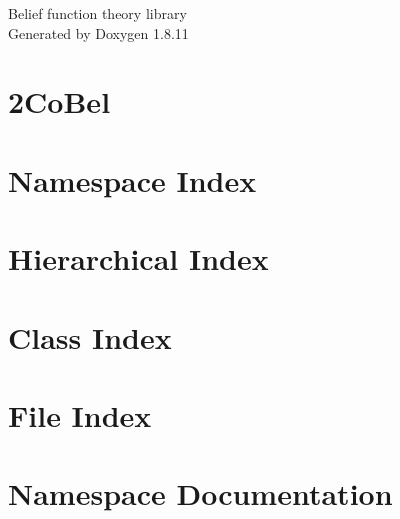 \documentclass[twoside]{book}
\newcommand{\+}{\discretionary{\mbox{\scriptsize$\hookleftarrow$}}{}{}}
\newcommand{\clearemptydoublepage}{%
  \newpage{\pagestyle{empty}\cleardoublepage}%
}
\begin{document}
\hypersetup{pageanchor=false,
             bookmarksnumbered=true,
             pdfencoding=unicode
            }
\begin{titlepage}
\vspace*{7cm}
\begin{center}%
{\Large Belief function theory library }\\
\vspace*{1cm}
{\large Generated by Doxygen 1.8.11}\\
\end{center}
\end{titlepage}
\clearemptydoublepage
\tableofcontents
\clearemptydoublepage
{}
\hypersetup{pageanchor=true}

\chapter{2\+Co\+Bel}
\label{md_README}
\hypertarget{md_README}{}

\chapter{Namespace Index}

\chapter{Hierarchical Index}

\chapter{Class Index}

\chapter{File Index}

\chapter{Namespace Documentation}




\end{document}
